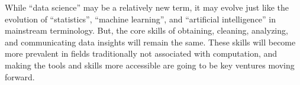 \documentclass[010-intro.tex]{subfiles}
\begin{document}

    While ``data science'' may be a relatively new term,
    it may evolve just like the evolution of ``statistics'', ``machine learning'', and ``artificial intelligence''
    in mainstream terminology.
    But, the core skills of obtaining, cleaning, analyzing, and communicating data insights will remain the same.
    These skills will become more prevalent in fields traditionally not associated with computation,
    and making the tools and skills more accessible are going to be key ventures moving forward.
\end{document}
